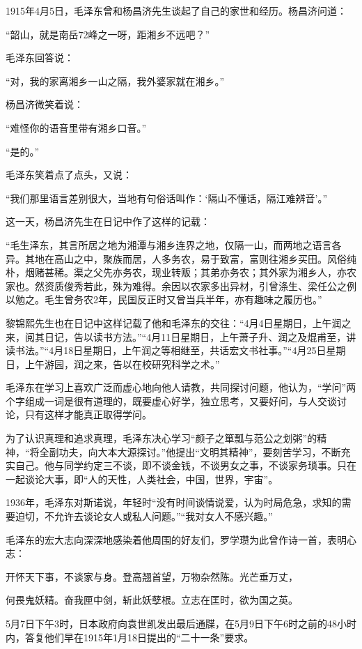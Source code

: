 \documentclass[../../dazhuan.tex]{subfiles}
\begin{document}
1915年4月5日，毛泽东曾和杨昌济先生谈起了自己的家世和经历。杨昌济问道：

“韶山，就是南岳72峰之一呀，距湘乡不远吧？”

毛泽东回答说：

“对，我的家离湘乡一山之隔，我外婆家就在湘乡。”

杨昌济微笑着说：

“难怪你的语音里带有湘乡口音。”

“是的。”

毛泽东笑着点了点头，又说：

“我们那里语言差别很大，当地有句俗话叫作：‘隔山不懂话，隔江难辨音’。”

这一天，杨昌济先生在日记中作了这样的记载：

“毛生泽东，其言所居之地为湘潭与湘乡连界之地，仅隔一山，而两地之语言各异。其地在高山之中，聚族而居，人多务农，易于致富，富则往湘乡买田。风俗纯朴，烟赌甚稀。渠之父先亦务农，现业转贩；其弟亦务农；其外家为湘乡人，亦农家也。然资质俊秀若此，殊为难得。余因以农家多出异材，引曾涤生、梁任公之例以勉之。毛生曾务农2年，民国反正时又曾当兵半年，亦有趣味之履历也。”

黎锦熙先生也在日记中这样记载了他和毛泽东的交往：“4月4日星期日，上午润之来，阅其日记，告以读书方法。”“4月11日星期日，上午萧子升、润之及焜甫至，讲读书法。”“4月18日星期日，上午润之等相继至，共话宏文书社事。”“4月25日星期日，上午游园，润之来，告以在校研究科学之术。”

毛泽东在学习上喜欢广泛而虚心地向他人请教，共同探讨问题，他认为，“学问”两个字组成一词是很有道理的，既要虚心好学，独立思考，又要好问，与人交谈讨论，只有这样才能真正取得学问。

为了认识真理和追求真理，毛泽东决心学习“颜子之箪瓢与范公之划粥”的精神，“将全副功夫，向大本大源探讨。”他提出“文明其精神”，要刻苦学习，不断充实自己。他与同学约定三不谈，即不谈金钱，不谈男女之事，不谈家务琐事。只在一起谈论大事，即“人的天性，人类社会，中国，世界，宇宙”。

1936年，毛泽东对斯诺说，年轻时“没有时间谈情说爱，认为时局危急，求知的需要迫切，不允许去谈论女人或私人问题。”“我对女人不感兴趣。”

毛泽东的宏大志向深深地感染着他周围的好友们，罗学瓒为此曾作诗一首，表明心志：

开怀天下事，不谈家与身。登高翘首望，万物杂然陈。光芒垂万丈，

何畏鬼妖精。奋我匣中剑，斩此妖孽根。立志在匡时，欲为国之英。

5月7日下午3时，日本政府向袁世凯发出最后通牒，在5月9日下午6时之前的48小时内，答复他们早在1915年1月18日提出的“二十一条”要求。
\end{document}
